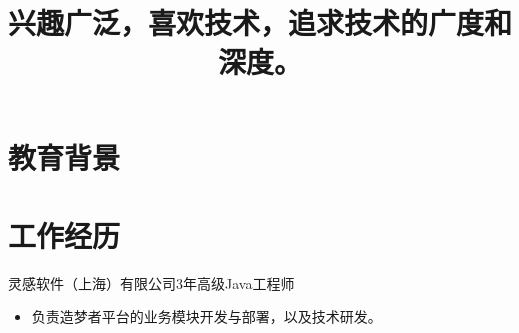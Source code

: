 \documentclass[11pt,a4paper,sans]{moderncv} %
\title{兴趣广泛，喜欢技术，追求技术的广度和深度。   }
\begin{document}


%
%
%
%
%



\makecvtitle %

\section{教育背景}


\section{工作经历}
 {灵感软件（上海）有限公司}{3年}{高级Java工程师}{}{
\begin{itemize}
    \item 负责造梦者平台的业务模块开发与部署，以及技术研发。
\end{itemize}
}
\end{document}
